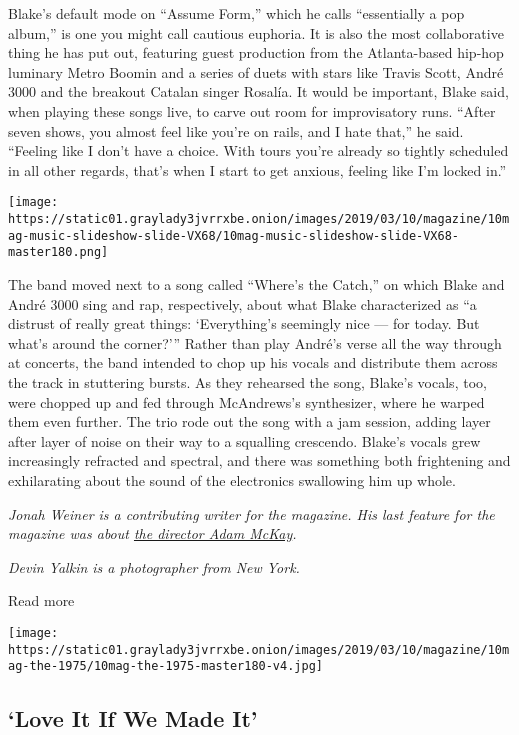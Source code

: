 Blake's default mode on ``Assume Form,'' which he calls ``essentially a
pop album,'' is one you might call cautious euphoria. It is also the
most collaborative thing he has put out, featuring guest production from
the Atlanta-based hip-hop luminary Metro Boomin and a series of duets
with stars like Travis Scott, André 3000 and the breakout Catalan singer
Rosalía. It would be important, Blake said, when playing these songs
live, to carve out room for improvisatory runs. ``After seven shows, you
almost feel like you're on rails, and I hate that,'' he said. ``Feeling
like I don't have a choice. With tours you're already so tightly
scheduled in all other regards, that's when I start to get anxious,
feeling like I'm locked in.''

\texttt{[image: https://static01.graylady3jvrrxbe.onion/images/2019/03/10/magazine/10mag-music-slideshow-slide-VX68/10mag-music-slideshow-slide-VX68-master180.png]}

The band moved next to a song called ``Where's the Catch,'' on which
Blake and André 3000 sing and rap, respectively, about what Blake
characterized as ``a distrust of really great things: `Everything's
seemingly nice --- for today. But what's around the corner?''' Rather
than play André's verse all the way through at concerts, the band
intended to chop up his vocals and distribute them across the track in
stuttering bursts. As they rehearsed the song, Blake's vocals, too, were
chopped up and fed through McAndrews's synthesizer, where he warped them
even further. The trio rode out the song with a jam session, adding
layer after layer of noise on their way to a squalling crescendo.
Blake's vocals grew increasingly refracted and spectral, and there was
something both frightening and exhilarating about the sound of the
electronics swallowing him up whole.

\emph{Jonah Weiner is a contributing writer for the magazine. His last
feature for the magazine was about
\href{https://www.nytimes3xbfgragh.onion/2018/11/29/magazine/adam-mckay-dick-cheney-vice.html}{the
director Adam McKay}.}

\emph{Devin Yalkin is a photographer from New York.}

Read more

\texttt{[image: https://static01.graylady3jvrrxbe.onion/images/2019/03/10/magazine/10mag-the-1975/10mag-the-1975-master180-v4.jpg]}

\hypertarget{--love-it-if-we-made-it}{%
\subsection{\texorpdfstring{ `Love It If We Made
It'}{  `Love It If We Made It'}}\label{--love-it-if-we-made-it}}

